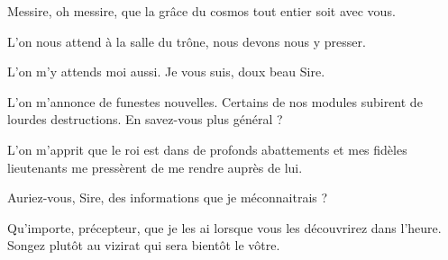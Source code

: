 \nopagebreak[4]
\begin{drama}\nopagebreak[4]
  \nopagebreak[4]\generalspeaks \nopagebreak[4] Messire, oh messire, que la grâce du cosmos tout entier soit avec vous.

  \elenaspeaks L’on nous attend à la salle du trône, nous devons nous y presser.

  \generalspeaks L’on m’y attends moi aussi. Je vous suis, doux beau Sire.

  \alexasspeaks L’on m’annonce de funestes nouvelles. Certains de nos modules subirent de lourdes destructions. En savez-vous plus général ?

  \generalspeaks L’on m’apprit que le roi est dans de profonds abattements et mes fidèles lieutenants me pressèrent de me rendre auprès de lui.

  \alexasspeaks {} Auriez-vous, Sire, des informations que je méconnaitrais ?

  \elenaspeaks Qu’importe, précepteur, que je les ai lorsque vous les découvrirez dans l’heure. Songez plutôt au vizirat qui sera bientôt le vôtre.
\end{drama}


\scene


\StageDirII{\roi, \reine, \elena, \alexas, \general, \suivantes, \kingsgards}




